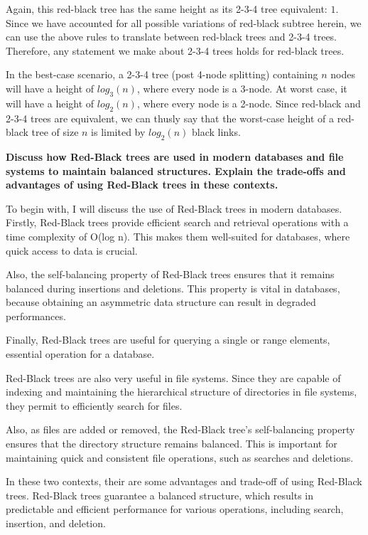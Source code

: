 \documentclass[12pt]{amsart}
\begin{document}
    Again, this red-black tree has the same height as its 2-3-4
    tree equivalent: $1$. Since we have accounted for all
    possible variations of red-black subtree herein, we can use
    the above rules to translate between red-black trees and
    2-3-4 trees. Therefore, any statement we make about 2-3-4
    trees holds for red-black trees.

    In the best-case scenario, a 2-3-4 tree (post 4-node
    splitting) containing $n$ nodes will have a height of
    $log_3(n)$, where every node is a 3-node. At worst case, it
    will have a height of $log_2(n)$, where every node is a
    2-node. Since red-black and 2-3-4 trees are equivalent, we
    can thusly say that the worst-case height of a red-black
    tree of size $n$ is limited by $log_2(n)$ black links.

    \newpage
    \textbf{Discuss how Red-Black trees are used in modern
    databases and file systems to maintain balanced structures.
    Explain the trade-offs and advantages of using Red-Black
    trees in these contexts.}

    To begin with, I will discuss the use of Red-Black trees in modern databases.
    Firstly, Red-Black trees provide efficient search and retrieval operations with a time complexity of O(log n). This makes them well-suited for databases, where quick access to data is crucial.
    
    Also, the self-balancing property of Red-Black trees ensures that it remains balanced during insertions and deletions. This property is vital in databases, because obtaining an asymmetric data structure can result in degraded performances.
    
    Finally, Red-Black trees are useful for querying a single or range elements, essential operation for a database.
    
    
    Red-Black trees are also very useful in file systems.
    Since they are capable of indexing and maintaining the hierarchical structure of directories in file systems, they permit to efficiently search for files.
    
    Also, as files are added or removed, the Red-Black tree's self-balancing property ensures that the directory structure remains balanced. This is important for maintaining quick and consistent file operations, such as searches and deletions.
    
    
    In these two contexts, their are some advantages and trade-off of using Red-Black trees.
    Red-Black trees guarantee a balanced structure, which results in predictable and efficient performance for various operations, including search, insertion, and deletion.
    
\end{document}
